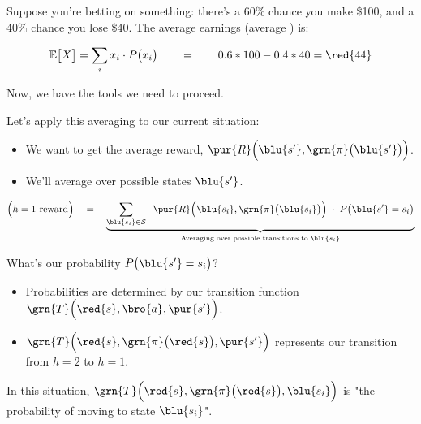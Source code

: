         \miniex Suppose you're betting on something: there's a 60\% chance you make \$100, and a 40\% chance you lose \$40. The average earnings (average ) is:

        \begin{equation}
            \mathbb{E} \big[ X \big] = 
            \sum_{i}  
                x_i \cdot P \big(x_i\big)
            \qquad=\qquad
            0.6 * 100 - 0.4 * 40 = \red{44}
        \end{equation}

        Now, we have the tools we need to proceed.

        \subsecdiv

        Let's apply this averaging to our current situation:

        \begin{itemize}
            \item We want to get the average reward, $\pur{R} \Big( \blu{s'},\grn{\pi}\big(\blu{s'}\big) \Big)$.
            \item We'll average over possible states $\blu{s'}$.
        \end{itemize}

        \begin{equation}
            \Big(h=1 \text{ reward}\Big)  
            \quad=\quad 
            \underbrace{
                \sum_{\blu{s_i} \in \mathcal{S}}  
                    \;\;
                    \pur{R} \Big( \blu{s_i},\grn{\pi}\big(\blu{s_i}\big) \Big)
                    \;\cdot\; 
                    P \big( \blu{s'}=s_i\big)
            }_{\text{Averaging over possible transitions to $\blu{s_i}$}}
        \end{equation}

        What's our probability $ P \big( \blu{s'}=s_i\big)$?

        \begin{itemize}
            \item Probabilities are determined by our transition function $\grn{T} \Big( \red{s},\bro{a},\pur{s'} \Big)$.
            \item $\grn{T} \Big( \red{s},\grn{\pi}\big(\red{s}\big),\pur{s'} \Big)$ represents our transition from $h=2$ to $h=1$.
        \end{itemize}

        In this situation, $\grn{T} \Big( \red{s},\grn{\pi}\big(\red{s}\big),\blu{s_i} \Big)$ is "the probability of moving to state $\blu{s_i}$".


